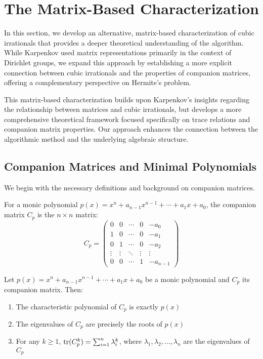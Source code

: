 \section{The Matrix-Based Characterization}\label{sec:matrix_approach}

In this section, we develop an alternative, matrix-based characterization of cubic irrationals that provides a deeper theoretical understanding of the \HAPD{} algorithm. While Karpenkov \cite{Karpenkov2022} used matrix representations primarily in the context of Dirichlet groups, we expand this approach by establishing a more explicit connection between cubic irrationals and the properties of companion matrices, offering a complementary perspective on Hermite's problem.

This matrix-based characterization builds upon Karpenkov's insights regarding the relationship between matrices and cubic irrationals, but develops a more comprehensive theoretical framework focused specifically on trace relations and companion matrix properties. Our approach enhances the connection between the algorithmic method and the underlying algebraic structure.

\subsection{Companion Matrices and Minimal Polynomials}

We begin with the necessary definitions and background on companion matrices.

\begin{definition}
For a monic polynomial $p(x) = x^n + a_{n-1}x^{n-1} + \cdots + a_1x + a_0$, the companion matrix $C_p$ is the $n \times n$ matrix:
\begin{equation}
C_p = \begin{pmatrix}
0 & 0 & \cdots & 0 & -a_0 \\
1 & 0 & \cdots & 0 & -a_1 \\
0 & 1 & \cdots & 0 & -a_2 \\
\vdots & \vdots & \ddots & \vdots & \vdots \\
0 & 0 & \cdots & 1 & -a_{n-1}
\end{pmatrix}
\end{equation}
\end{definition}

\begin{proposition}\label{prop:companion_properties}
Let $p(x) = x^n + a_{n-1}x^{n-1} + \cdots + a_1x + a_0$ be a monic polynomial and $C_p$ its companion matrix. Then:
\begin{enumerate}
    \item The characteristic polynomial of $C_p$ is exactly $p(x)$
    \item The eigenvalues of $C_p$ are precisely the roots of $p(x)$
    \item For any $k \geq 1$, $\operatorname{tr}(C_p^k) = \sum_{i=1}^{n} \lambda_i^k$, where $\lambda_1, \lambda_2, \ldots, \lambda_n$ are the eigenvalues of $C_p$
\end{enumerate}
\end{proposition}


